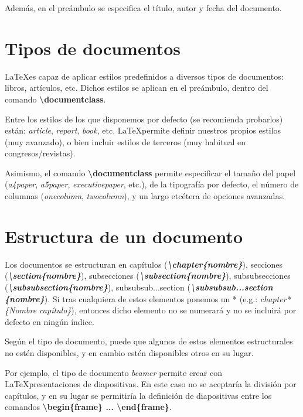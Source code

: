 \documentclass[12pt]{book} %
\begin{document}
Además, en el preámbulo se especifica el título, autor y fecha del documento.

\section{Tipos de documentos}

\LaTeX es capaz de aplicar estilos predefinidos a diversos tipos de documentos: libros, artículos, etc. Dichos estilos se aplican en el preámbulo, dentro del comando \textbf{\textbackslash documentclass}.

Entre los estilos de los que disponemos por defecto (se recomienda probarlos) están: \emph{article}, \emph{report}, \emph{book}, etc. \LaTeX permite definir nuestros propios estilos (muy avanzado), o bien incluir estilos de terceros (muy habitual en congresos/revistas).

Asimismo, el comando \textbf{\textbackslash documentclass} permite especificar el tamaño del papel (\emph{a4paper}, \emph{a5paper}, \emph{executivepaper}, etc.), de la tipografía por defecto, el número de columnas (\emph{onecolumn}, \emph{twocolumn}), y un largo etcétera de opciones avanzadas.

\section{Estructura de un documento}

Los documentos se estructuran en capítulos (\textbf{\emph{\textbackslash chapter\{nombre\}}}), secciones (\textbf{\emph{\textbackslash section\{nombre\}}}), subsecciones (\textbf{\emph{\textbackslash subsection\{nombre\}}}), subsubsecciones (\textbf{\emph{\textbackslash subsubsection\{nombre\}}}), subsubsub...section (\textbf{\emph{\textbackslash  subsubsub...section \{nombre\}}}). Si tras cualquiera de estos elementos ponemos un * (e.g.: \emph{chapter*\{Nombre capítulo\}}), entonces dicho elemento no se numerará y no se incluirá por defecto en ningún índice.

Según el tipo de documento, puede que algunos de estos elementos estructurales no estén disponibles, y en cambio estén disponibles otros en su lugar.

Por ejemplo, el tipo de documento \emph{beamer} permite crear con \LaTeX presentaciones de diapositivas. En este caso no se aceptaría la división por capítulos, y en su lugar se permitiría la definición de diapositivas entre los comandos \textbf{\textbackslash begin\{frame\} ... \textbackslash end\{frame\}}.
\end{document}
